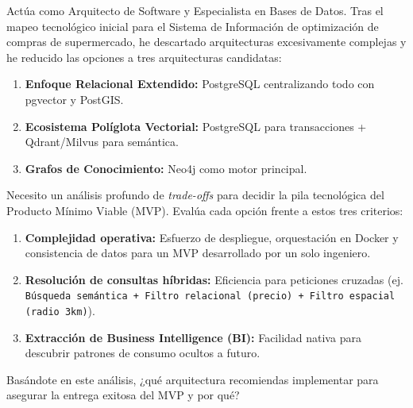 \begin{tcolorbox}[colback=promptcolor, title=Prompt Introducido, colframe=blue!50!black, breakable]
	Actúa como Arquitecto de Software y Especialista en Bases de Datos. Tras el mapeo tecnológico inicial para el Sistema de Información de optimización de compras de supermercado, he descartado arquitecturas excesivamente complejas y he reducido las opciones a tres arquitecturas candidatas:
	\begin{enumerate}
		\item \textbf{Enfoque Relacional Extendido:} PostgreSQL centralizando todo con pgvector y PostGIS.
		\item \textbf{Ecosistema Políglota Vectorial:} PostgreSQL para transacciones + Qdrant/Milvus para semántica.
		\item \textbf{Grafos de Conocimiento:} Neo4j como motor principal.
	\end{enumerate}

	Necesito un análisis profundo de \textit{trade-offs} para decidir la pila tecnológica del Producto Mínimo Viable (MVP). Evalúa cada opción frente a estos tres criterios:
	\begin{enumerate}[label=\Alph*)]
		\item \textbf{Complejidad operativa:} Esfuerzo de despliegue, orquestación en Docker y consistencia de datos para un MVP desarrollado por un solo ingeniero.
		\item \textbf{Resolución de consultas híbridas:} Eficiencia para peticiones cruzadas (ej. \texttt{Búsqueda semántica + Filtro relacional (precio) + Filtro espacial (radio 3km)}).
		\item \textbf{Extracción de Business Intelligence (BI):} Facilidad nativa para descubrir patrones de consumo ocultos a futuro.
	\end{enumerate}

	Basándote en este análisis, ¿qué arquitectura recomiendas implementar para asegurar la entrega exitosa del MVP y por qué?
\end{tcolorbox}

